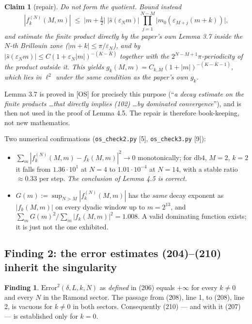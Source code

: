 \documentclass[11pt,a4paper]{article}
\newtheorem{claim}{Claim}
\theoremstyle{definition}
\newtheorem{finding}{Finding}
\newcommand{\eps}{\varepsilon}
\newcommand{\sh}{\hat{s}}
\newcommand{\OS}{\textup{[OS]}}
\begin{document}
\begin{claim}[repair]
Do not form the quotient. Bound instead
\[
  |f^{(N)}_k(M,m)|\;\le\;\Big|m+\tfrac k2\Big|\;\big|\sh(\eps_N m)\big|
  \prod_{j=1}^{N-M}\big|m_0(\eps_{M+j}(m+k))\big| ,
\]
and estimate the \emph{finite product} directly by the paper's own Lemma 3.7 inside the
$N$-th Brillouin zone ($|m+k|\le\pi/\eps_N$), and by $|\sh(\eps_Nm)|\le C(1+\eps_N|m|)^{-(K-\bar K)}$
together with the $2^{N-M+1}\pi$-periodicity of the product outside it. This yields
$g_k(M,m)=C_{k,M}(1+|m|)^{-(K-\bar K-1)}$, which lies in $\ell^2$ under the same condition as
the paper's own $g_k$.
\end{claim}

\noindent
Lemma 3.7 is proved in \OS{} for precisely this purpose (``\emph{a decay estimate on the finite
products \dots that directly implies (102) \dots by dominated convergence}''), and is then not
used in the proof of Lemma 4.5. The repair is therefore book-keeping, not new mathematics.

\medskip\noindent
Two numerical confirmations (\texttt{os\_check2.py} [5], \texttt{os\_check3.py} [9]):
\begin{itemize}[leftmargin=1.4em,itemsep=1pt]
\item $\sum_m|f^{(N)}_k(M,m)-f_k(M,m)|^2\to0$ monotonically; for $\mathrm{db}4$, $M=2$, $k=2$ it
falls from $1.36\cdot10^{1}$ at $N=4$ to $1.01\cdot10^{-4}$ at $N=14$, with a stable ratio
$\approx0.33$ per step. \emph{The conclusion of Lemma 4.5 is correct.}
\item $G(m):=\sup_{N>M}|f^{(N)}_k(M,m)|$ has the \emph{same} decay exponent as $|f_k(M,m)|$ on
every dyadic window up to $m=2^{13}$, and $\sum_mG(m)^2/\sum_m|f_k(M,m)|^2=1.008$. A valid
dominating function exists; it is just not the one exhibited.
\end{itemize}

\subsection{Finding 2: the error estimates (204)--(210) inherit the singularity}

\begin{finding}\label{f:error}
$\mathrm{Error}^2(\delta,L,k,N)$ as \emph{defined} in (206) equals $+\infty$ for every $k\neq0$
and every $N$ in the Ramond sector. The passage from (208), line 1, to (208), line 2, is
vacuous for $k\neq0$ in both sectors. Consequently (210) --- and with it (207) --- is
established only for $k=0$.
\end{finding}
\end{document}
